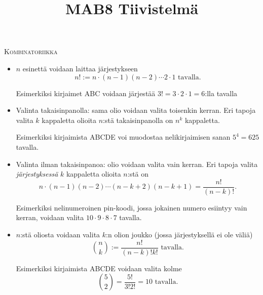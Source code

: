 \documentclass[12pt,leqno,a4paper,oneside]{amsart}
\theoremstyle{definition}
\theoremstyle{remark}
\numberwithin{equation}{section}
\begin{document}
\title{MAB8 Tiivistelmä}
\maketitle

\textsc{Kombinatoriikka}
\begin{itemize}
\item
$n$ esinettä voidaan laittaa järjestykseen 
$$n!:=n\cdot (n-1)(n-2)\cdots 2\cdot 1 \text{ tavalla.}$$ 


Esimerkiksi kirjaimet ABC voidaan järjestää $3! = 3\cdot 2\cdot 1 = 6$:lla tavalla

\item 

Valinta takaisinpanolla: sama olio voidaan valita toisenkin kerran. Eri tapoja valita $k$ kappaletta olioita $n$:stä takaisinpanolla on $n^k$ kappaletta.

Esimerkiksi kirjaimista ABCDE voi muodostaa nelikirjaimisen sanan $5^4 = 625$ tavalla.

\item
 Valinta ilman takaisinpanoa: olio voidaan valita vain kerran. Eri tapoja valita \emph{järjestyksessä} $k$ kappaletta olioita $n$:stä on 
 $$n\cdot (n-1)(n-2)\cdots (n-k+2)(n-k+1) = \frac{n!}{(n-k)!} .$$
 
 Esimerkiksi nelinumeroinen pin-koodi, jossa jokainen numero esiintyy vain kerran, voidaan valita $10\cdot 9\cdot 8\cdot 7$ tavalla.
 
\item
$n$:stä oliosta voidaan valita $k$:n olion joukko (jossa järjestyksellä ei ole väliä)
$${n \choose k} := \frac{n!}{(n-k)! k!} \text{ tavalla.}$$


Esimerkiksi kirjaimista ABCDE voidaan valita kolme 
$${5 \choose 2} = \frac{5!}{3!2!} = 10 \text{ tavalla.}$$

\end{itemize}
\end{document}
